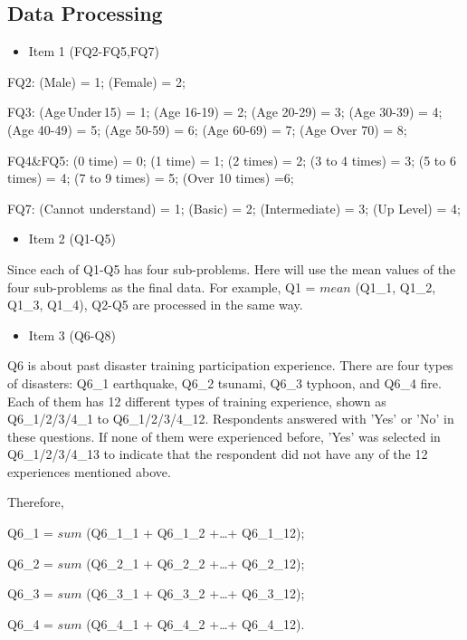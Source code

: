 \subsection{Data Processing}
\begin{itemize}
\item Item 1 (FQ2-FQ5,FQ7)
\end{itemize}

FQ2: (Male) = 1; (Female) = 2;

FQ3: (Age\,Under\,15) = 1; (Age 16-19) = 2; (Age 20-29) = 3; (Age 30-39) = 4; (Age 40-49) = 5; (Age 50-59) = 6; (Age 60-69) = 7; (Age Over 70) = 8;

FQ4\&FQ5: (0 time) = 0; (1 time) = 1; (2 times) = 2; (3 to 4 times) = 3; (5 to 6 times) = 4; (7 to 9 times) = 5; (Over 10 times) =6;


FQ7: (Cannot understand) = 1; (Basic) = 2; (Intermediate) = 3; (Up Level) = 4; 

\begin{itemize}
\item Item 2 (Q1-Q5)
\end{itemize}

Since each of Q1-Q5 has four sub-problems. Here will use the mean values of the four sub-problems as the final data. For example, Q1 = $mean$ (Q1\_1, Q1\_2, Q1\_3, Q1\_4), Q2-Q5 are processed in the same way.

\begin{itemize}
\item Item 3 (Q6-Q8)
\end{itemize}

Q6 is about past disaster training participation experience. There are four types of disasters: Q6\_1 earthquake, Q6\_2 tsunami, Q6\_3 typhoon, and Q6\_4 fire. Each of them has 12 different types of training experience, shown as Q6\_1/2/3/4\_1 to Q6\_1/2/3/4\_12. Respondents answered with 'Yes' or 'No' in these questions. If none of them were experienced before, 'Yes' was selected in Q6\_1/2/3/4\_13 to indicate that the respondent did not have any of the 12 experiences mentioned above. 

Therefore, 

Q6\_1 = $sum$ (Q6\_1\_1 + Q6\_1\_2 +\dots+ Q6\_1\_12);

Q6\_2 = $sum$ (Q6\_2\_1 + Q6\_2\_2 +\dots+ Q6\_2\_12);

Q6\_3 = $sum$ (Q6\_3\_1 + Q6\_3\_2 +\dots+ Q6\_3\_12);

Q6\_4 = $sum$ (Q6\_4\_1 + Q6\_4\_2 +\dots+ Q6\_4\_12).

